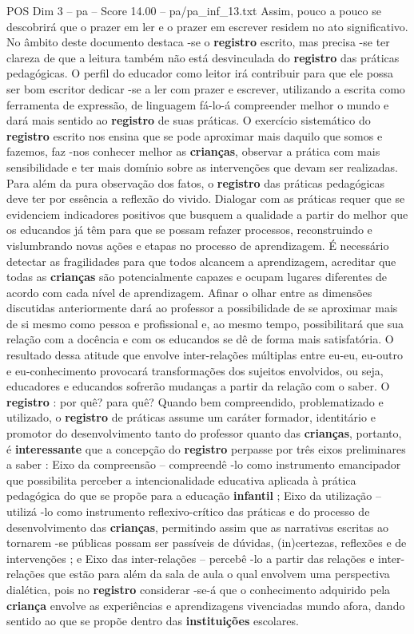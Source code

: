 \begin{textsample}{POS Dim 3 – pa – Score 14.00 – pa/pa\_inf\_13.txt}
Assim, pouco a pouco se descobrirá que o prazer em ler e o prazer em escrever residem no ato significativo.
No âmbito deste documento destaca -se o \textbf{registro} escrito, mas precisa -se ter clareza de que a leitura também não está desvinculada do \textbf{registro} das práticas pedagógicas.
O perfil do educador como leitor irá contribuir para que ele possa ser bom escritor dedicar -se a ler com prazer e escrever, utilizando a escrita como ferramenta de expressão, de linguagem fá-lo-á compreender melhor o mundo e dará mais sentido ao \textbf{registro} de suas práticas.
O exercício sistemático do \textbf{registro} escrito nos ensina que se pode aproximar mais daquilo que somos e fazemos, faz -nos conhecer melhor as \textbf{crianças}, observar a prática com mais sensibilidade e ter mais domínio sobre as intervenções que devam ser realizadas.
Para além da pura observação dos fatos, o \textbf{registro} das práticas pedagógicas deve ter por essência a reflexão do vivido.
Dialogar com as práticas requer que se evidenciem indicadores positivos que busquem a qualidade a partir do melhor que os educandos já têm para que se possam refazer processos, reconstruindo e vislumbrando novas ações e etapas no processo de aprendizagem.
É necessário detectar as fragilidades para que todos alcancem a aprendizagem, acreditar que todas as \textbf{crianças} são potencialmente capazes e ocupam lugares diferentes de acordo com cada nível de aprendizagem.
Afinar o olhar entre as dimensões discutidas anteriormente dará ao professor a possibilidade de se aproximar mais de si mesmo como pessoa e profissional e, ao mesmo tempo, possibilitará que sua relação com a docência e com os educandos se dê de forma mais satisfatória.
O resultado dessa atitude que envolve inter-relações múltiplas entre eu-eu, eu-outro e eu-conhecimento provocará transformações dos sujeitos envolvidos, ou seja, educadores e educandos sofrerão mudanças a partir da relação com o saber.
O \textbf{registro} : por quê? para quê?
Quando bem compreendido, problematizado e utilizado, o \textbf{registro} de práticas assume um caráter formador, identitário e promotor do desenvolvimento tanto do professor quanto das \textbf{crianças}, portanto, é \textbf{interessante} que a concepção do \textbf{registro} perpasse por três eixos preliminares a saber : Eixo da compreensão – compreendê -lo como instrumento emancipador que possibilita perceber a intencionalidade educativa aplicada à prática pedagógica do que se propõe para a educação \textbf{infantil} ; Eixo da utilização – utilizá -lo como instrumento reflexivo-crítico das práticas e do processo de desenvolvimento das \textbf{crianças}, permitindo assim que as narrativas escritas ao tornarem -se públicas possam ser passíveis de dúvidas, (in)certezas, reflexões e de intervenções ; e Eixo das inter-relações – percebê -lo a partir das relações e inter-relações que estão para além da sala de aula o qual envolvem uma perspectiva dialética, pois no \textbf{registro} considerar -se-á que o conhecimento adquirido pela \textbf{criança} envolve as experiências e aprendizagens vivenciadas mundo afora, dando sentido ao que se propõe dentro das \textbf{instituições} escolares.

\end{textsample}
